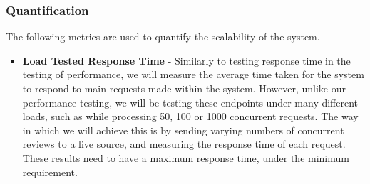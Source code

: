 \documentclass[12pt]{article}
\begin{document}
\subsubsection{Quantification}
The following metrics are used to quantify the scalability of the system.
\begin{itemize}
    \item \textbf{Load Tested Response Time} - Similarly to testing response time in the testing of performance, we will measure the average time taken for the system to respond to main requests made within the system. However, unlike our performance testing, we will be testing these endpoints under many different loads, such as while processing 50, 100 or 1000 concurrent requests.
          The way in which we will achieve this is by sending varying numbers of concurrent reviews to a live source, and measuring the response time of each request. These results need to have a maximum response time, under the minimum requirement.
\end{itemize}
\end{document}
